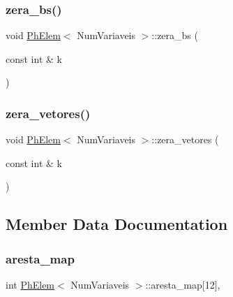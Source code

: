 \subsubsection{\texorpdfstring{zera\+\_\+bs()}{zera\_bs()}}
{\footnotesize\ttfamily void \hyperlink{classPhElem}{Ph\+Elem}$<$ Num\+Variaveis $>$\+::zera\+\_\+bs (\begin{DoxyParamCaption}\item[{const int \&}]{k }\end{DoxyParamCaption})\hspace{0.3cm}{\ttfamily [inherited]}}

\mbox{\label{classPhElem_a46f2be4d83b5c7c2cc9c6699f1fe977c}} 
\subsubsection{\texorpdfstring{zera\+\_\+vetores()}{zera\_vetores()}}
{\footnotesize\ttfamily void \hyperlink{classPhElem}{Ph\+Elem}$<$ Num\+Variaveis $>$\+::zera\+\_\+vetores (\begin{DoxyParamCaption}\item[{const int \&}]{k }\end{DoxyParamCaption})\hspace{0.3cm}{\ttfamily [inherited]}}



\subsection{Member Data Documentation}
\mbox{\label{classPhElem_a27a4f856d62b68758e4c03c09b4c37f8}} 
\subsubsection{\texorpdfstring{aresta\+\_\+map}{aresta\_map}}
{\footnotesize\ttfamily int \hyperlink{classPhElem}{Ph\+Elem}$<$ Num\+Variaveis $>$\+::aresta\+\_\+map\mbox{[}12\mbox{]}\hspace{0.3cm}{\ttfamily [protected]}, {\ttfamily [inherited]}}



